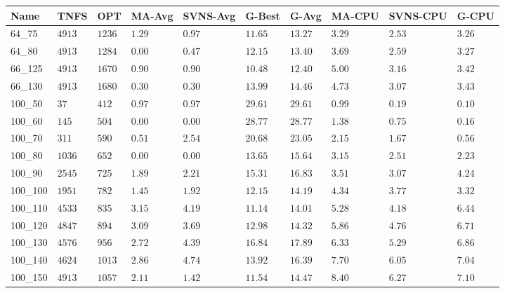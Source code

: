 \begin{center}
\begin{table}[]
\centering
\begin{tabular}{|lll|l|l|ll|lll|}
\hline
Name     & TNFS        & OPT    & MA-Avg & SVNS-Avg & G-Best & G-Avg & MA-CPU & SVNS-CPU & G-CPU \\
\hline
64\_75   & $4913   $   & $1236$ & $1.29$ & $0.97$   & $11.65$    & $13.27$   & $3.29 $& $2.53$   & $3.26$ \\
64\_80   & $4913   $   & $1284$ & $\bm{0.00}$ & $0.47$   & $12.15$    & $13.40$   & $3.69 $& $2.59$   & $3.27$ \\
\hline
66\_125  & $4913   $   & $1670$ & $0.90$ & $0.90$   & $10.48$    & $12.40$   & $5.00 $& $3.16$   & $3.42$ \\
66\_130  & $4913   $   & $1680$ & $0.30$ & $0.30$   & $13.99$    & $14.46$   & $4.73 $& $3.07$   & $3.43$ \\
\hline
100\_50  & $37     $   & $412 $ & $0.97$ & $0.97$   & $29.61$    & $29.61$   & $0.99 $& $0.19$   & $0.10$ \\
100\_60  & $145    $   & $504 $ & $\bm{0.00}$ & $\bm{0.00}$   & $28.77$    & $28.77$   & $1.38 $& $0.75$   & $0.16$ \\
100\_70  & $311    $   & $590 $ & $0.51$ & $2.54$   & $20.68$    & $23.05$   & $2.15 $& $1.67$   & $0.56$ \\
100\_80  & $1036   $   & $652 $ & $\bm{0.00}$ & $\bm{0.00}$   & $13.65$    & $15.64$   & $3.15 $& $2.51$   & $2.23$ \\
100\_90  & $2545   $   & $725 $ & $1.89$ & $2.21$   & $15.31$    & $16.83$   & $3.51 $& $3.07$   & $4.24$ \\
100\_100 & $1951   $   & $782 $ & $1.45$ & $1.92$   & $12.15$    & $14.19$   & $4.34 $& $3.77$   & $3.32$ \\
100\_110 & $4533   $   & $835 $ & $3.15$ & $4.19$   & $11.14$    & $14.01$   & $5.28 $& $4.18$   & $6.44$ \\
100\_120 & $4847   $   & $894 $ & $3.09$ & $3.69$   & $12.98$    & $14.32$   & $5.86 $& $4.76$   & $6.71$ \\
100\_130 & $4576   $   & $956 $ & $2.72$ & $4.39$   & $16.84$    & $17.89$   & $6.33 $& $5.29$   & $6.86$ \\
100\_140 & $4624   $   & $1013$ & $2.86$ & $4.74$   & $13.92$    & $16.39$   & $7.70 $& $6.05$   & $7.04$ \\
100\_150 & $4913   $   & $1057$ & $2.11$ & $1.42$   & $11.54$    & $14.47$   & $8.40 $& $6.27$   & $7.10$ \\

\end{tabular}
\end{table}
\end{center}
